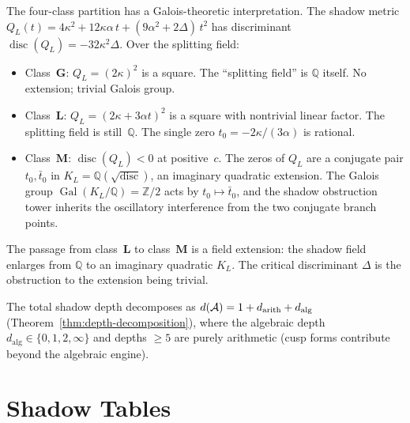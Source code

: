 \begin{remark}\label{rem:galois-splitting}
The four-class partition has a Galois-theoretic interpretation.
The shadow metric $Q_L(t) = 4\kappa^2 + 12\kappa\alpha\,t
+ (9\alpha^2 + 2\Delta)\,t^2$ has discriminant
$\operatorname{disc}(Q_L) = -32\kappa^2\Delta$.
Over the splitting field:
\begin{itemize}
\item Class~$\mathbf{G}$: $Q_L = (2\kappa)^2$ is a square.
 The ``splitting field'' is $\mathbb{Q}$ itself.
 No extension; trivial Galois group.
\item Class~$\mathbf{L}$: $Q_L = (2\kappa + 3\alpha t)^2$ is
 a square with nontrivial linear factor. The splitting field
 is still~$\mathbb{Q}$. The single zero $t_0 = -2\kappa/(3\alpha)$
 is rational.
\item Class~$\mathbf{M}$: $\operatorname{disc}(Q_L) < 0$ at
 positive~$c$. The zeros of $Q_L$ are a conjugate pair
 $t_0, \bar{t}_0$ in $K_L = \mathbb{Q}(\sqrt{\operatorname{disc}})$,
 an imaginary quadratic extension. The Galois group
 $\operatorname{Gal}(K_L/\mathbb{Q}) = \mathbb{Z}/2$ acts by
 $t_0 \mapsto \bar{t}_0$, and the shadow obstruction tower inherits the
 oscillatory interference from the two conjugate branch points.
\end{itemize}
The passage from class~$\mathbf{L}$ to class~$\mathbf{M}$
is a field extension: the shadow field enlarges from $\mathbb{Q}$
to an imaginary quadratic $K_L$. The critical discriminant
$\Delta$ is the obstruction to the extension being trivial.
\end{remark}

\begin{remark}\label{rem:total-depth}
The total shadow depth decomposes as
$d(\mathcal{A}) = 1 + d_{\mathrm{arith}} + d_{\mathrm{alg}}$
(Theorem~\ref{thm:depth-decomposition}), where the algebraic depth
$d_{\mathrm{alg}} \in \{0, 1, 2, \infty\}$ and depths $\geq 5$ are
purely arithmetic (cusp forms contribute beyond the algebraic engine).
\end{remark}



\section{Shadow Tables}\label{sec:shadow-tables}


